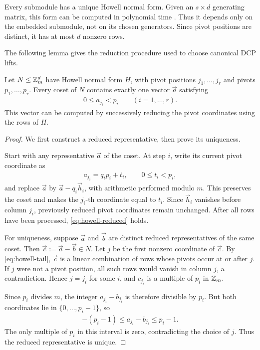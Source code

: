 Every submodule has a unique Howell normal form.
Given an $s\times d$ generating matrix, this form
can be computed in polynomial time
\cite{storjohann1998fast}.
Thus it depends only on the embedded submodule,
not on its chosen generators. Since pivot positions
are distinct, it has at most $d$ nonzero rows.

The following lemma gives the reduction procedure
used to choose canonical DCP lifts.

\begin{lemma}
    \label{lem:howell-remainders}
    Let $N\leq\mathbb{Z}_m^d$ have Howell normal form $H$,
    with pivot positions $j_1,\ldots,j_r$ and
    pivots $p_1,\ldots,p_r$.
    Every coset of $N$ contains exactly one vector
    $\vec{a}$ satisfying
    \begin{align}
        0\leq a_{j_i}<p_i
        \qquad (i=1,\ldots,r).
        \label{eq:howell-reduced}
    \end{align}
    This vector can be computed by successively
    reducing the pivot coordinates using the rows
    of $H$.
\end{lemma}

\begin{proof}
    We first construct a reduced representative,
    then prove its uniqueness.

    Start with any representative $\vec{a}$ of
    the coset. At step $i$, write its current
    pivot coordinate as
    \begin{align}
        a_{j_i}=q_ip_i+t_i,
        \qquad 0\leq t_i<p_i,
    \end{align}
    and replace $\vec{a}$ by
    $\vec{a}-q_i\vec{h}_i$, with arithmetic performed
    modulo $m$. This preserves the coset and makes
    the $j_i$-th coordinate equal to $t_i$.
    Since $\vec{h}_i$ vanishes before column $j_i$,
    previously reduced pivot coordinates remain
    unchanged. After all rows have been processed,
    \cref{eq:howell-reduced} holds.

    For uniqueness, suppose $\vec{a}$ and $\vec{b}$
    are distinct reduced representatives of the
    same coset. Then
    $\vec{c}:=\vec{a}-\vec{b}\in N$.
    Let $j$ be the first nonzero coordinate of
    $\vec{c}$. By \cref{eq:howell-tail},
    $\vec{c}$ is a linear combination of rows
    whose pivots occur at or after $j$.
    If $j$ were not a pivot position, all such
    rows would vanish in column $j$, a contradiction.
    Hence $j=j_i$ for some $i$, and $c_{j_i}$
    is a multiple of $p_i$ in $\mathbb{Z}_m$.

    Since $p_i$ divides $m$, the integer
    $a_{j_i}-b_{j_i}$ is therefore divisible by
    $p_i$. But both coordinates lie in
    $\{0,\ldots,p_i-1\}$, so
    \begin{align}
        -(p_i-1)
        \leq a_{j_i}-b_{j_i}
        \leq p_i-1.
    \end{align}
    The only multiple of $p_i$ in this interval
    is zero, contradicting the choice of $j$.
    Thus the reduced representative is unique.
\end{proof}

